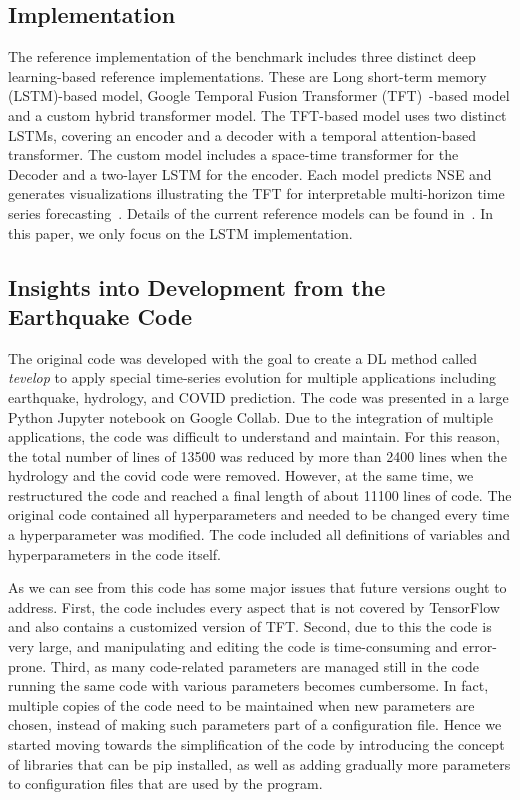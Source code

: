 \documentclass[utf8]{FrontiersinVancouver} %
\begin{document}
\subsection{Implementation}

The reference implementation of the benchmark includes three
distinct deep learning-based reference implementations. These are Long
short-term memory (LSTM)-based model, Google Temporal Fusion
Transformer (TFT)~\citep{TFT-21}-based model and a custom hybrid
transformer model. The TFT-based model uses two distinct LSTMs,
covering an encoder and a decoder with a temporal attention-based
transformer. The custom model includes a space-time transformer for
the Decoder and a two-layer LSTM for the encoder. Each model predicts
NSE and generates visualizations illustrating the TFT for
interpretable multi-horizon time series
forecasting~\citep{TFT-21}. Details of the current reference models can
be found in~\citep{fox2022-jm}.  In this paper, we only focus on the
LSTM implementation.

\subsection{Insights into Development from the Earthquake Code}

The original code was developed with the goal to create a DL method
called {\em tevelop} to apply special time-series evolution for
multiple applications including earthquake, hydrology, and COVID
prediction. The code was presented in a large Python Jupyter notebook
on Google Collab.  Due to the integration of multiple applications, the
code was difficult to understand and maintain. For this reason, the
total number of lines of 13500 was reduced by more than 2400 lines
when the hydrology and the covid code were removed.  However, at the
same time, we restructured the code and reached a final length of about
11100 lines of code.  The original code contained all hyperparameters
and needed to be changed every time a hyperparameter was modified.
The code included all definitions of variables and hyperparameters in
the code itself.

As we can see from this code has some major issues that future
versions ought to address. First, the code includes every aspect that
is not covered by TensorFlow and also contains a customized version of
TFT. Second, due to this the code is very large, and manipulating and
editing the code is time-consuming and error-prone. Third, as many
code-related parameters are managed still in the code running the
same code with various parameters becomes cumbersome. In fact, multiple
copies of the code need to be maintained when new parameters are
chosen, instead of making such parameters part of a configuration
file. Hence we started moving towards the simplification of the code
by introducing the concept of libraries that can be pip installed, as
well as adding gradually more parameters to configuration files that
are used by the program.
\end{document}
